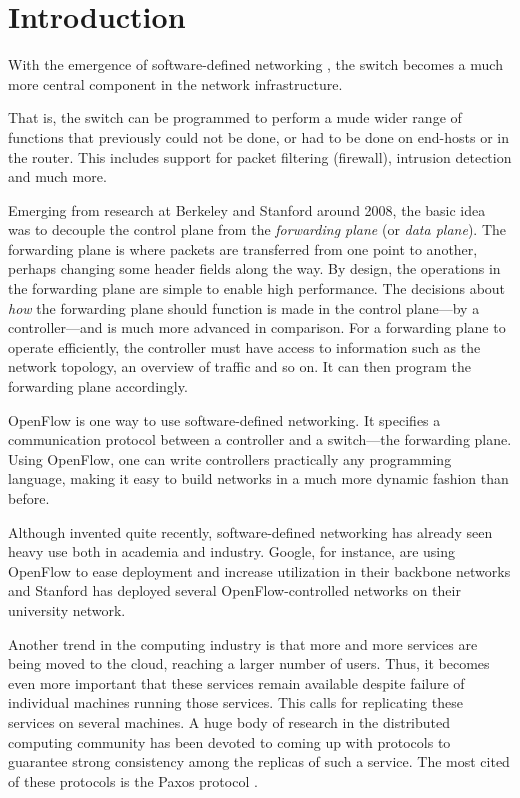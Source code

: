 \chapter{Introduction}
\label{chapter:introduction}

With the emergence of software-defined networking
\cite{Casado:2005:VNS:1047344.1047383}, the switch becomes a much
more central component in the network infrastructure.

That is, the switch can be programmed to perform a mude wider range of
functions that previously could not be done, or had to be done on end-hosts
or in the router.
%
This includes support for packet filtering (firewall), intrusion detection
and much more.

Emerging from research at Berkeley and
Stanford around 2008, the basic idea was to decouple the
control plane from the \textit{forwarding plane} (or
\textit{data plane}).
%
The forwarding plane is where packets are transferred from one point to
another, perhaps changing some header fields along the way.
%
By design, the operations in the forwarding plane are simple to enable high
performance.
%
The decisions about \textit{how} the forwarding plane should function is
made in the control plane---by a controller---and is much more advanced in
comparison.
%
For a forwarding plane to operate efficiently, the controller must have
access to information such as the network topology, an overview of traffic
and so on.  It can then program the forwarding plane accordingly.

OpenFlow \cite{openflow-1.0} is one way to use software-defined
networking.  It specifies a communication protocol between a controller and
a switch---the forwarding plane.
Using OpenFlow, one can write controllers practically any programming
language, making it easy to build networks in a much more dynamic fashion
than before.

Although invented quite recently, software-defined networking has already
seen heavy use both in academia and industry.
%
Google, for instance, are
using OpenFlow to ease deployment and increase utilization in their backbone
networks \cite{crabbe2012sdn} and Stanford has deployed several
OpenFlow-controlled networks on their university network.

Another trend in the computing industry is that more and more services are
being moved to the cloud, reaching a larger number of users.
%
Thus, it becomes even more important that these services remain available
despite failure of individual machines running those services.
%
This calls for replicating these services on several machines.
%
A huge body of research in the distributed computing community has been
devoted to coming up with protocols to guarantee strong consistency among
the replicas of such a service.
%
The most cited of these protocols is the Paxos protocol
\cite{Lam01,Lamport:1998:PP:279227.279229}.

